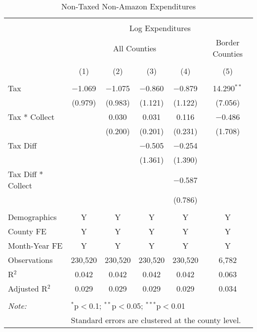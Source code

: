 
\begin{table}[!htbp] \centering 
  \caption{Non-Taxed Non-Amazon Expenditures} 
  \label{} 
\begin{tabular}{@{\extracolsep{5pt}}lccccc} 
\\[-1.8ex]\hline 
\hline \\[-1.8ex] 
 & \multicolumn{5}{c}{Log Expenditures} \\ 
\cline{2-6} 
 & \multicolumn{4}{c}{All Counties} & Border Counties \\ 
\\[-1.8ex] & (1) & (2) & (3) & (4) & (5)\\ 
\hline \\[-1.8ex] 
 Tax & $-$1.069 & $-$1.075 & $-$0.860 & $-$0.879 & 14.290$^{**}$ \\ 
  & (0.979) & (0.983) & (1.121) & (1.122) & (7.056) \\ 
  Tax * Collect &  & 0.030 & 0.031 & 0.116 & $-$0.486 \\ 
  &  & (0.200) & (0.201) & (0.231) & (1.708) \\ 
  Tax Diff &  &  & $-$0.505 & $-$0.254 &  \\ 
  &  &  & (1.361) & (1.390) &  \\ 
  Tax Diff * Collect &  &  &  & $-$0.587 &  \\ 
  &  &  &  & (0.786) &  \\ 
 \hline \\[-1.8ex] 
Demographics & Y & Y & Y & Y & Y \\ 
County FE & Y & Y & Y & Y & Y \\ 
Month-Year FE & Y & Y & Y & Y & Y \\ 
Observations & 230,520 & 230,520 & 230,520 & 230,520 & 6,782 \\ 
R$^{2}$ & 0.042 & 0.042 & 0.042 & 0.042 & 0.063 \\ 
Adjusted R$^{2}$ & 0.029 & 0.029 & 0.029 & 0.029 & 0.034 \\ 
\hline 
\hline \\[-1.8ex] 
\textit{Note:}  & \multicolumn{5}{l}{$^{*}$p$<$0.1; $^{**}$p$<$0.05; $^{***}$p$<$0.01} \\ 
 & \multicolumn{5}{l}{Standard errors are clustered at the county level.} \\ 
\end{tabular} 
\end{table} 

